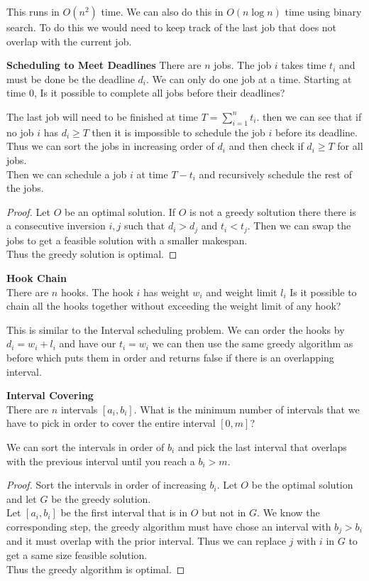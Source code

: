 \documentclass[answers,12pt,addpoints]{exam}
\begin{document}
\begin{questions}
\begin{solution}
    This runs in $O(n^2)$ time. We can also do this in $O(n \log n)$ time using binary search.
    To do this we would need to keep track of the last job that does not overlap with the current job.\\
\end{solution}
\question\textbf{Scheduling to Meet Deadlines}
There are $n$ jobs. The job $i$ takes time $t_i$ and must be done be the deadline $d_i$. We can only do one job at a time. Starting at time $0$, Is it possible to complete all jobs before their deadlines?
\begin{solution}
    The last job will need to be finished at time $T = \sum_{i=1}^n t_i$. then we can see that if no job $i$ has $d_i \geq T$ then it is impossible to schedule the job $i$ before its deadline.\\
    Thus we can sort the jobs in increasing order of $d_i$ and then check if $d_i \geq T$ for all jobs.\\
    Then we can schedule a job $i$ at time $T - t_i$ and recursively schedule the rest of the jobs.
    \begin{proof}
        Let $O$ be an optimal solution. If $O$ is not a greedy soltution there there is a consecutive inversion $i,j$ such that $d_i > d_j$ and $t_i < t_j$. Then we can swap the jobs to get a feasible solution with a smaller makespan.\\
        Thus the greedy solution is optimal.
    \end{proof}
\end{solution} 
\question\textbf{Hook Chain}\\
There are $n$ hooks. The hook $i$ has weight $w_i$ and weight limit $l_i$ Is it possible to chain all the hooks together without exceeding the weight limit of any hook?
\begin{solution}
    This is similar to the Interval scheduling problem. We can order the hooks by $d_i = w_i + l_i$ and have our $t_i = w_i$ we can then use the same greedy algorithm as before which puts them in order and returns false if there is an overlapping interval. 
\end{solution}
\question\textbf{Interval Covering}\\
There are $n$ intervals $[a_i,b_i]$. What is the minimum number of intervals that we have to pick in order to cover the entire interval $[0,m]$?
\begin{solution}
    We can sort the intervals in order of $b_i$ and pick the last interval that overlaps with the previous interval until you reach a $b_i > m$.
    \begin{proof}
        Sort the intervals in order of increasing $b_i$. Let $O$ be the optimal solution and let $G$ be the greedy solution.\\
        Let $[a_i,b_i]$ be the first interval that is in $O$ but not in $G$. We know the corresponding step, the greedy algorithm must have chose an interval with $b_j > b_i$ and it must overlap with the prior interval. Thus we can replace $j$ with $i$ in $G$ to get a same size feasible solution.\\
        Thus the greedy algorithm is optimal.
    \end{proof}
\end{solution}

\end{questions}
\end{document}
